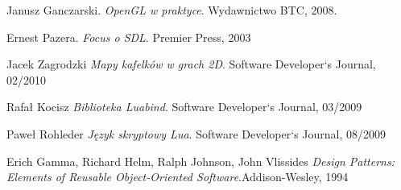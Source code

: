 \begin{thebibliography}{1}

Janusz Ganczarski. 
\emph{OpenGL w praktyce}. Wydawnictwo BTC, 2008.

Ernest Pazera. 
\emph{Focus o SDL}. Premier Press, 2003

Jacek Zagrodzki 
\emph{Mapy kafelków w grach 2D}. Software Developer`s Journal, 02/2010

Rafał Kocisz 
\emph{Biblioteka Luabind}. Software Developer`s Journal, 03/2009

Paweł Rohleder 
\emph{Język skryptowy Lua}. Software Developer`s Journal, 08/2009


Erich Gamma, Richard Helm, Ralph Johnson, John Vlissides 
\emph{Design Patterns: Elements of Reusable Object-Oriented Software}.Addison-Wesley, 1994


\end{thebibliography}



 